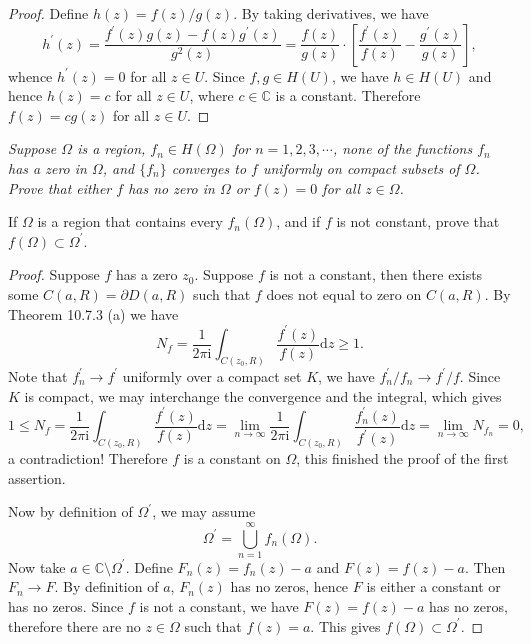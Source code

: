 \begin{proof}
Define $h(z)=f(z)/g(z)$. By taking derivatives, we have 
$$
h^{\prime}\left( z \right) =\frac{f^{\prime}\left( z \right) g\left( z \right) -f\left( z \right) g^{\prime}\left( z \right)}{g^2\left( z \right)}=\frac{f\left( z \right)}{g\left( z \right)}\cdot \left[ \frac{f^{\prime}\left( z \right)}{f\left( z \right)}-\frac{g^{\prime}\left( z \right)}{g\left( z \right)} \right] ,
$$
whence $h^\prime(z)=0$ for all $z\in U$. Since $f,g\in H(U)$, we have $h\in H(U)$ and hence $h(z)=c$ for all $z\in U$, where $c\in\mathbb{C}$ is a constant. Therefore $f(z)=cg(z)$ for all $z\in U$.
\end{proof}
\begin{problem}\em
Suppose $\Omega$ is a region, $f_n\in H(\Omega)$ for $n=1,2,3,\cdots$, none of the functions $f_n$ has a zero in $\Omega$, and $\{f_n\}$ converges to $f$ uniformly on compact subsets of $\Omega$. Prove that either $f$ has no zero in $\Omega$ or $f(z)=0$ for all $z\in\Omega$.\par
If $\Omega$ is a region that contains every $f_n(\Omega)$, and if $f$ is not constant, prove that $f(\Omega)\subset\Omega^\prime$.
\end{problem}
\begin{proof}
Suppose $f$ has a zero $z_0$. Suppose $f$ is not a constant, then there exists some $C(a,R)=\partial D(a,R)$ such that $f$ does not equal to zero on $C(a,R)$. By Theorem 10.7.3 (a) we have 
$$
N_f=\frac{1}{2\pi \mathrm{i}}\int_{C\left( z_0,R \right)}{\frac{f^{\prime}\left( z \right)}{f\left( z \right)}\mathrm{d}z}\ge 1.
$$
Note that $f_n^\prime\to f^\prime$ uniformly over a compact set $K$, we have $f_n^\prime/f_n\to f^\prime/f$. Since $K$ is compact, we may interchange the convergence and the integral, which gives 
$$
1\le N_f=\frac{1}{2\pi \mathrm{i}}\int_{C\left( z_0,R \right)}{\frac{f^{\prime}\left( z \right)}{f\left( z \right)}\mathrm{d}z}=\lim_{n\rightarrow \infty} \frac{1}{2\pi \mathrm{i}}\int_{C\left( z_0,R \right)}{\frac{f_{n}^{\prime}\left( z \right)}{f^{\prime}\left( z \right)}\mathrm{d}z}=\lim_{n\rightarrow \infty} N_{f_n}=0,
$$
a contradiction! Therefore $f$ is a constant on $\Omega$, this finished the proof of the first assertion.\par
Now by definition of $\Omega^\prime$, we may assume 
$$
\Omega ^{\prime}=\bigcup_{n=1}^{\infty}{f_n\left( \Omega \right)}.
$$
Now take $a\in\mathbb{C}\setminus\Omega^\prime$. Define $F_n(z)=f_n(z)-a$ and $F(z)=f(z)-a$. Then $F_n\to F$. By definition of $a$, $F_n(z)$ has no zeros, hence $F$ is either a constant or has no zeros. Since $f$ is not a constant, we have $F(z)=f(z)-a$ has no zeros, therefore there are no $z\in\Omega$ such that $f(z)=a$. This gives $f(\Omega)\subset\Omega^\prime$.
\end{proof}
